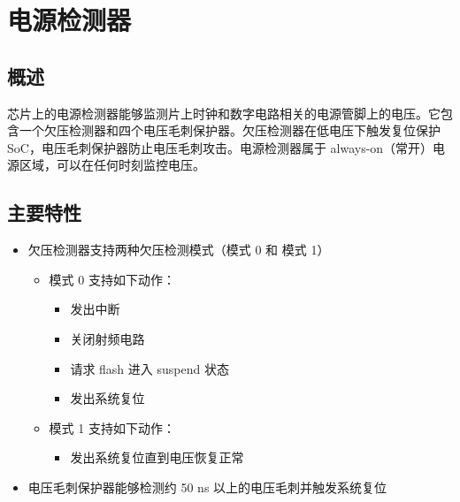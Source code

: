 \documentclass[main\_\_CN.tex]{subfiles}
\begin{document}

\ifglobal
\else
    {\let\clearpage\relax \listoftodos}
    {\let\clearpage\relax \listofdonetodos}
    \tableofcontents
\fi



\hypertarget{psdet}{}
\chapter{电源检测器}
\label{mod:psdet}


\section{概述}

\chipname{} 芯片上的电源检测器能够监测片上时钟和数字电路相关的电源管脚上的电压。它包含一个欠压检测器和四个电压毛刺保护器。欠压检测器在低电压下触发复位保护 SoC，电压毛刺保护器防止电压毛刺攻击。电源检测器属于 always-on（常开）电源区域，可以在任何时刻监控电压。



\section{主要特性}
\label{sec:alias-features}

\begin{itemize}
    \item 欠压检测器支持两种欠压检测模式（模式 0 和 模式 1）
    \begin{itemize}
    \item 模式 0 支持如下动作：
        \begin{itemize}
        \item 发出中断
        \item 关闭射频电路
        \item 请求 flash 进入 suspend 状态
        \item 发出系统复位
        \end{itemize}
    \item 模式 1 支持如下动作：
        \begin{itemize}
        \item 发出系统复位直到电压恢复正常
        \end{itemize}
    \end{itemize}
    \item 电压毛刺保护器能够检测约 50 ns 以上的电压毛刺并触发系统复位
\end{itemize}
\end{document}
